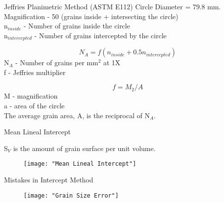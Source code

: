 \documentclass[10pt]{beamer}
\begin{document}
{%
\begin{frame}[fragile]{Jeffries Planimetric Method (ASTM E112)}
Circle Diameter = 79.8 mm. \\
Magnification - 50 (grains inside + intersecting the circle) \\
n$ _{inside} $ - Number of grains inside the circle \\
n$_{intercepted}$ - Number of grains intercepted by the circle

\begin{equation*}
N_{A} = f(n_{inside} + 0.5n_{intercepted})  
\end{equation*}
N$_{A}$ - Number of grains per mm$^{2}$ at 1X \\ 
f - Jeffries multiplier

\begin{equation*}
f = M_{2}/A                                                     
\end{equation*}
M - magnification \\
a - area of the circle \\

The average grain area, A, is the reciprocal of N$ _{A} $.
   
\end{frame}
}

{%
\begin{frame}[fragile]{Mean Lineal Intercept}

S$ _{V} $ is the amount of grain surface per unit volume.

\begin{figure}[H]
\texttt{[image: "Mean Lineal Intercept"]}
\end{figure}
    
\end{frame}
}

{%
\begin{frame}[fragile]{Mistakes in Intercept Method}

\begin{figure}[H]
\texttt{[image: "Grain Size Error"]}
\end{figure}
    
\end{frame}
}
\end{document}
